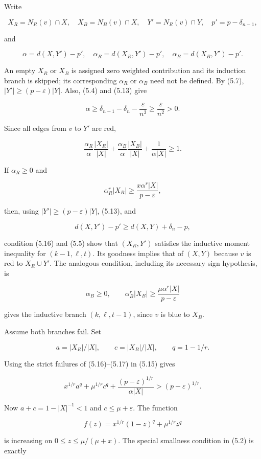 Write

\[
X_R=N_R(v)\cap X,\quad X_B=N_B(v)\cap X,\quad
Y'=N_R(v)\cap Y,\quad p'=p-\delta_{n-1},
\]

and

\[
\alpha=d(X,Y')-p',\quad
\alpha_R=d(X_R,Y')-p',\quad
\alpha_B=d(X_B,Y')-p'.
\]

An empty \(X_R\) or \(X_B\) is assigned zero weighted contribution and
its induction branch is skipped; its corresponding \(\alpha_R\) or
\(\alpha_B\) need not be defined. By (5.7),
\(|Y'|\ge(p-\varepsilon)|Y|\). Also, (5.4) and (5.13) give

\[
\alpha\ge
\delta_{n-1}-\delta_n-\frac\varepsilon{n^3}
\ge\frac\varepsilon{n^2}>0.
\tag{5.14}
\]

Since all edges from \(v\) to \(Y'\) are red,

\[
\frac{\alpha_R}{\alpha}\frac{|X_R|}{|X|}
+\frac{\alpha_B}{\alpha}\frac{|X_B|}{|X|}
+\frac1{\alpha|X|}\ge1.
\tag{5.15}
\]

If \(\alpha_R\ge0\) and

\[
\alpha_R^r|X_R|
\ge\frac{x\alpha^r|X|}{p-\varepsilon},
\tag{5.16}
\]

then, using \(|Y'|\ge(p-\varepsilon)|Y|\), (5.13), and

\[
d(X,Y')-p'\ge d(X,Y)+\delta_n-p,
\]

condition (5.16) and (5.5) show that \((X_R,Y')\) satisfies the
inductive moment inequality for \((k-1,\ell,t)\). Its goodness implies
that of \((X,Y)\) because \(v\) is red to \(X_R\cup Y'\). The analogous
condition, including its necessary sign hypothesis, is

\[
\alpha_B\ge0,
\qquad
\alpha_B^r|X_B|
\ge\frac{\mu\alpha^r|X|}{p-\varepsilon}
\tag{5.17}
\]

gives the inductive branch \((k,\ell,t-1)\), since \(v\) is blue to
\(X_B\).

Assume both branches fail. Set

\[
a=|X_R|/|X|,\qquad c=|X_B|/|X|,\qquad q=1-1/r.
\]

Using the strict failures of (5.16)--(5.17) in (5.15) gives

\[
x^{1/r}a^q+\mu^{1/r}c^q
+\frac{(p-\varepsilon)^{1/r}}{\alpha|X|}
>(p-\varepsilon)^{1/r}.
\tag{5.18}
\]

Now \(a+c=1-|X|^{-1}<1\) and \(c\le\mu+\varepsilon\). The function

\[
f(z)=x^{1/r}(1-z)^q+\mu^{1/r}z^q
\]

is increasing on \(0\le z\le\mu/(\mu+x)\). The special smallness
condition in (5.2) is exactly

